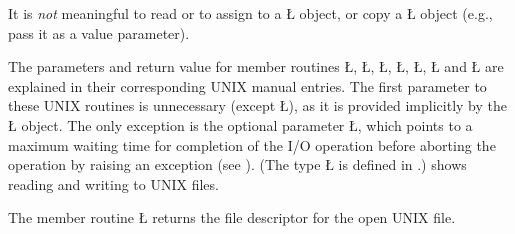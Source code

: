 \documentclass[openright,twoside]{report}
\begin{document}
It is \emph{not} meaningful to read or to assign to a \LGinlinetrue\LGbegin\lgrinde\L{}\endlgrinde\LGend{} object, or copy a \LGinlinetrue\LGbegin\lgrinde\L{}\endlgrinde\LGend{} object (e.g., pass it as a value parameter).

The parameters and return value for member routines \LGinlinetrue\LGbegin\lgrinde\L{}\endlgrinde\LGend{}, \LGinlinetrue\LGbegin\lgrinde\L{}\endlgrinde\LGend{}, \LGinlinetrue\LGbegin\lgrinde\L{}\endlgrinde\LGend{}, \LGinlinetrue\LGbegin\lgrinde\L{}\endlgrinde\LGend{}, \LGinlinetrue\LGbegin\lgrinde\L{}\endlgrinde\LGend{}, \LGinlinetrue\LGbegin\lgrinde\L{}\endlgrinde\LGend{} and \LGinlinetrue\LGbegin\lgrinde\L{}\endlgrinde\LGend{} are explained in their corresponding UNIX manual entries.
The first parameter to these UNIX routines is unnecessary (except \LGinlinetrue\LGbegin\lgrinde\L{}\endlgrinde\LGend{}), as it is provided implicitly by the \LGinlinetrue\LGbegin\lgrinde\L{}\endlgrinde\LGend{} object.
The only exception is the optional parameter \LGinlinetrue\LGbegin\lgrinde\L{}\endlgrinde\LGend{}, which points to a maximum waiting time for completion of the I/O operation before aborting the operation by raising an exception (see ).
(The type \LGinlinetrue\LGbegin\lgrinde\L{}\endlgrinde\LGend{} is defined in .)
 shows reading and writing to UNIX files.

The member routine \LGinlinetrue\LGbegin\lgrinde\L{}\endlgrinde\LGend{} returns the file descriptor for the open UNIX file.
\end{document}
